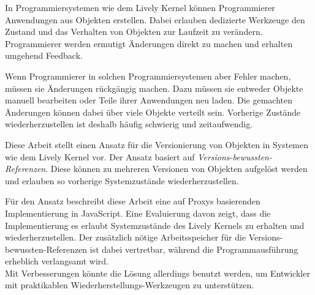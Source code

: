 \begin{zusammenfassung}

In Programmiersystemen wie dem Lively Kernel können Programmierer Anwendungen aus Objekten erstellen.
Dabei erlauben dedizierte Werkzeuge den Zustand und das Verhalten von Objekten zur Laufzeit zu verändern.
Programmierer werden ermutigt Änderungen direkt zu machen und erhalten umgehend Feedback.

Wenn Programmierer in solchen Programmiersystemen aber Fehler machen, müssen sie Änderungen rückgängig machen.
Dazu müssen sie entweder Objekte manuell bearbeiten oder Teile ihrer Anwendungen neu laden.
Die gemachten Änderungen können dabei über viele Objekte verteilt sein.
Vorherige Zustände wiederherzustellen ist deshalb häufig schwierig und zeitaufwendig.

Diese Arbeit stellt einen Ansatz für die Versionierung von Objekten in Systemen wie dem Lively Kernel vor.
Der Ansatz basiert auf \emph{Versions-bewussten-Referenzen}.
Diese können zu mehreren Versionen von Objekten aufgelöst werden und erlauben so vorherige Systemzustände wiederherzustellen.

Für den Ansatz beschreibt diese Arbeit eine auf Proxys basierenden Implementierung in JavaScript.
Eine Evaluierung davon zeigt, dass die Implementierung es erlaubt Systemzustände des Lively Kernels zu erhalten und wiederherzustellen.
Der zusätzlich nötige Arbeitsspeicher für die Versions-bewussten-Referenzen ist dabei vertretbar, während die Programmausführung erheblich verlangsamt wird.\\
Mit Verbesserungen könnte die Lösung allerdings benutzt werden, um Entwickler mit praktikablen Wiederherstellungs-Werkzeugen zu unterstützen.

\end{zusammenfassung}

